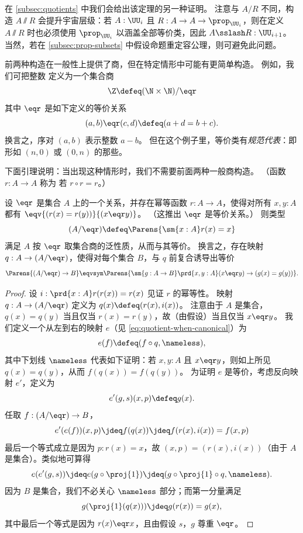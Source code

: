 在 \cref{subsec:quotients} 中我们会给出该定理的另一种证明。
注意与 $A/R$ 不同，构造 $A\sslash R$ 会提升宇宙层级：若 $A:\UU_i$ 且 $R:A\to A\to \prop_{\UU_i}$，则在定义 $A\sslash R$ 时也必须使用 $\prop_{\UU_i}$ 以涵盖全部等价类，因此 $A\sslash R : \UU_{i+1}$。
当然，若在 \cref{subsec:prop-subsets} 中假设命题重定容公理，则可避免此问题。

\begin{rmk}\label{defn-Z}
前两种构造在一般性上提供了商，但在特定情形中可能有更简单构造。
例如，我们可把整数 \Z 定义为一个集合商
%
%
%
\[ \Z \defeq (\N \times \N)/{\eqr} \]
%
其中 $\eqr$ 是如下定义的等价关系
%
\[ (a,b) \eqr (c,d) \defeq (a + d = b + c). \]
%
换言之，序对 $(a,b)$ 表示整数 $a - b$。
但在这个例子里，等价类有\emph{规范代表}：即形如 $(n,0)$ 或 $(0,n)$ 的那些。
\end{rmk}

下面引理说明：当出现这种情形时，我们不需要前面两种一般商构造。
（函数 $r:A\to A$ 称为
%
%
若 $r\circ r = r$。）

\begin{lem}\label{lem:quotient-when-canonical-representatives}
  设 $\eqr$ 是集合 $A$ 上的一个关系，并存在幂等函数 $r
  : A \to A$，使得对所有 $x, y: A$ 都有 $\eqv{(r(x) = r(y))}{(x \eqr y)}$。
  （这推出 $\eqr$ 是等价关系。）
  则类型
  \begin{equation*}
    (A/{\eqr}) \defeq \Parens{\sm{x : A} r(x) = x}
  \end{equation*}
  满足 $A$ 按 $\eqr$ 取集合商的泛性质，从而与其等价。
  换言之，存在映射 $q : A \to (A/{\eqr})$，使得对每个集合 $B$，与 $q$ 前复合诱导出等价
  \begin{equation}
    \label{eq:quotient-when-canonical}
    \Parens{(A/{\eqr}) \to B} \eqvsym \Parens{\sm{g : A \to B} \prd{x, y : A} (x \eqr y) \to (g(x) = g(y))}.
  \end{equation}
\end{lem}

\begin{proof}
  设 $i : \prd{x : A} r(r(x)) = r(x)$ 见证 $r$ 的幂等性。
  映射 $q : A \to (A/{\eqr})$ 定义为 $q(x) \defeq (r(x), i(x))$。
  注意由于 $A$ 是集合，$q(x)=q(y)$ 当且仅当 $r(x)=r(y)$，故（由假设）当且仅当 $x \eqr y$。
  我们定义一个从左到右的映射 $e$（见 \eqref{eq:quotient-when-canonical}）为
  \[ e(f) \defeq (f \circ q, \nameless), \]
  其中下划线 $\nameless$ 代表如下证明：若 $x, y : A$ 且 $x \eqr y$，则如上所见 $q(x)=q(y)$，从而 $f(q(x)) = f(q(y))$。
  为证明 $e$ 是等价，考虑反向映射 $e'$，定义为
  \[ e'(g, s) (x,p) \defeq g(x). \]
  任取 $f : (A/{\eqr}) \to B$，
  \[ e'(e(f))(x, p) \jdeq f(q(x)) \jdeq f(r(x), i(x)) = f(x, p) \]
  最后一个等式成立是因为 $p : r(x) = x$，故 $(x,p) = (r(x), i(x))$（由于 $A$ 是集合）。类似地可算得
  \[ e(e'(g, s)) \jdeq e(g \circ \proj{1}) \jdeq (g \circ \proj{1} \circ q, {\nameless}). \]
  因为 $B$ 是集合，我们不必关心 $\nameless$ 部分；而第一分量满足
  \[ g(\proj{1}(q(x))) \jdeq g(r(x)) = g(x), \]
  其中最后一个等式是因为 $r(x) \eqr x$，且由假设 $s$，$g$ 尊重 $\eqr$。
\end{proof}

